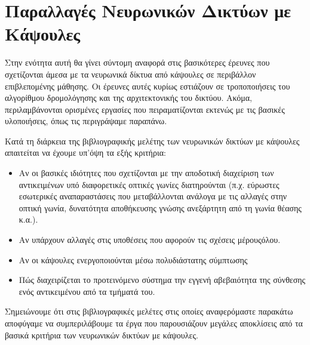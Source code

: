 \section{Παραλλαγές Νευρωνικών Δικτύων με Κάψουλες}

Στην ενότητα αυτή θα γίνει σύντομη αναφορά στις βασικότερες έρευνες που σχετίζονται άμεσα με τα νευρωνικά δίκτυα από κάψουλες σε περιβάλλον επιβλεπομένης μάθησης. Οι έρευνες αυτές κυρίως εστιάζουν σε τροποποιήσεις του αλγορίθμου δρομολόγησης και της αρχιτεκτονικής του δικτύου. Ακόμα, περιλαμβάνονται ορισμένες εργασίες που πειραματίζονται εκτενώς με τις βασικές υλοποιήσεις, όπως τις περιγράψαμε παραπάνω.\par

Κατά τη διάρκεια της βιβλιογραφικής μελέτης των νευρωνικών δικτύων με κάψουλες απαιτείται να έχουμε υπ'όψη τα εξής κριτήρια:
\begin{itemize}
    \item Αν οι βασικές ιδιότητες που σχετίζονται με την αποδοτική διαχείριση των αντικειμένων υπό διαφορετικές οπτικές γωνίες διατηρούνται (π.χ. εύρωστες εσωτερικές αναπαραστάσεις που μεταβάλλονται ανάλογα με τις αλλαγές στην οπτική γωνία, δυνατότητα αποθήκευσης γνώσης ανεξάρτητη από τη γωνία θέασης κ.α.).
    \item Αν υπάρχουν αλλαγές στις υποθέσεις που αφορούν τις σχέσεις μέρους\textendash όλου.
    \item Αν οι κάψουλες ενεργοποιούνται μέσω πολυδιάστατης σύμπτωσης 
    \item Πώς διαχειρίζεται το προτεινόμενο σύστημα την εγγενή αβεβαιότητα της σύνθεσης ενός αντικειμένου από τα τμήματά του. \cite{de2020introducing}
\end{itemize}\par

Σημειώνουμε ότι στις βιβλιογραφικές μελέτες στις οποίες αναφερόμαστε παρακάτω αποφύγαμε να συμπεριλάβουμε τα έργα που παρουσιάζουν μεγάλες αποκλίσεις από τα βασικά κριτήρια των νευρωνικών δικτύων με κάψουλες.\par

\subsubsection{}

